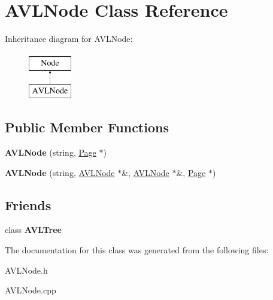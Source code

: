 \hypertarget{class_a_v_l_node}{\section{A\+V\+L\+Node Class Reference}
\label{class_a_v_l_node}
}
Inheritance diagram for A\+V\+L\+Node\+:\begin{figure}[H]
\begin{center}
\leavevmode
\includegraphics[height=2.000000cm]{class_a_v_l_node}
\end{center}
\end{figure}
\subsection*{Public Member Functions}
\begin{DoxyCompactItemize}
\item 
\hypertarget{class_a_v_l_node_af27568a3d6ad4d83e651a0cc0f4057aa}{{\bfseries A\+V\+L\+Node} (string, \hyperlink{class_page}{Page} $\ast$)}\label{class_a_v_l_node_af27568a3d6ad4d83e651a0cc0f4057aa}

\item 
\hypertarget{class_a_v_l_node_ac549cb5dbe98c28f5335ceaf0f602111}{{\bfseries A\+V\+L\+Node} (string, \hyperlink{class_a_v_l_node}{A\+V\+L\+Node} $\ast$\&, \hyperlink{class_a_v_l_node}{A\+V\+L\+Node} $\ast$\&, \hyperlink{class_page}{Page} $\ast$)}\label{class_a_v_l_node_ac549cb5dbe98c28f5335ceaf0f602111}

\end{DoxyCompactItemize}
\subsection*{Friends}
\begin{DoxyCompactItemize}
\item 
\hypertarget{class_a_v_l_node_abb802889854b7d6aebdc6c5a9f751b0e}{class {\bfseries A\+V\+L\+Tree}}\label{class_a_v_l_node_abb802889854b7d6aebdc6c5a9f751b0e}

\end{DoxyCompactItemize}


The documentation for this class was generated from the following files\+:\begin{DoxyCompactItemize}
\item 
A\+V\+L\+Node.\+h\item 
A\+V\+L\+Node.\+cpp\end{DoxyCompactItemize}
